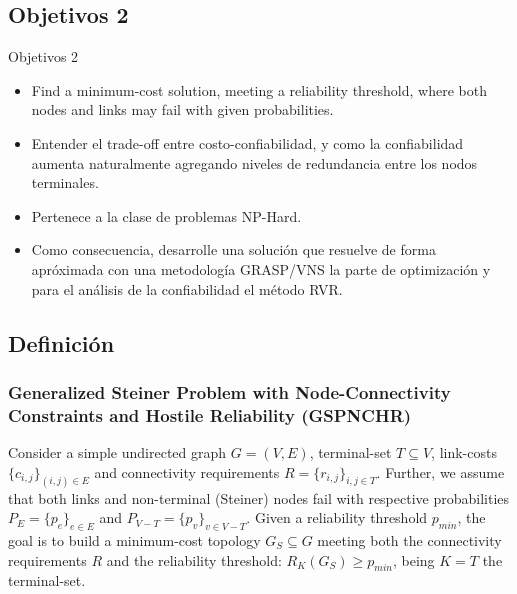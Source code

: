 \subsection{Objetivos 2}
\begin{frame}%
    \begin{block}{Objetivos 2}
	\begin{itemize} 
    	\item Find a minimum-cost solution, meeting a reliability threshold, where both nodes and links may fail with given probabilities.
		\item Entender el trade-off entre costo-confiabilidad, y como la confiabilidad aumenta naturalmente agregando niveles de redundancia entre los nodos terminales.
    	\item Pertenece a la clase de problemas NP-Hard.
    	\item Como consecuencia, desarrolle una solución que resuelve de forma apróximada con una metodología GRASP/VNS la parte de optimización y para el análisis de la confiabilidad el método RVR.
	\end{itemize} 
    \end{block}
\end{frame}

\subsection{Definición}
\begin{frame}\frametitle{Generalized Steiner Problem with Node-Connectivity Constraints and
Hostile Reliability (GSPNCHR)}
    \begin{definition}[GSPNCHR]
Consider a simple undirected graph $G=(V,E)$, terminal-set $T \subseteq V$, link-costs $\{c_{i,j}\}_{(i,j) \in E}$ 
and connectivity requirements $R=\{r_{i,j}\}_{i,j \in T}$. Further, we assume that both links and non-terminal (Steiner) nodes 
fail with respective probabilities $P_E=\{p_e\}_{e\in E}$ and $P_{V-T}=\{p_v\}_{v\in V-T}$. 
Given a reliability threshold $p_{min}$, the goal is to build 
a minimum-cost topology $G_S \subseteq G$ meeting both the connectivity requirements 
$R$ and the reliability threshold: $R_{K}(G_S) \geq p_{min}$, being $K=T$ the terminal-set.
\end{definition}
\end{frame}

